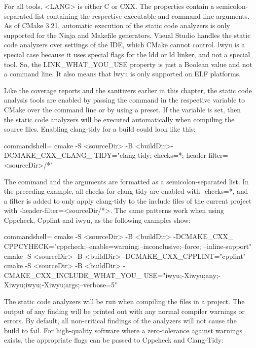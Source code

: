 For all tools, <LANG> is either C or CXX. The properties contain a semicolon-separated list containing the respective executable and command-line arguments. As of CMake 3.21, automatic execution of the static code analyzers is only supported for the Ninja and Makefile generators. Visual Studio handles the static code analyzers over settings of the IDE, which CMake cannot control. lwyu is a special case because it uses special flags for the ldd or ld linker, and not a special tool. So, the LINK\_WHAT\_YOU\_USE property is just a Boolean value and not a command line. It also means that lwyu is only supported on ELF platforms. 

Like the coverage reports and the sanitizers earlier in this chapter, the static code analysis tools are enabled by passing the command in the respective variable to CMake over the command line or by using a preset. If the variable is set, then the static code analyzers will be executed automatically when compiling the source files. Enabling clang-tidy for a build could look like this:

\begin{tcblisting}{commandshell={}}
cmake -S <sourceDir> -B <buildDir>-DCMAKE_CXX_CLANG_
	TIDY="clang-tidy;-checks=*;-header-filter=<sourceDir>/*"
\end{tcblisting}

The command and the arguments are formatted as a semicolon-separated list. In the preceding example, all checks for clang-tidy are enabled with -checks=*, and a filter is added to only apply clang-tidy to the include files of the current project with -header-filter=<sourceDir/*>. The same patterns work when using Cppcheck, Cpplint and iwyu, as the following examples show:

\begin{tcblisting}{commandshell={}}
cmake -S <sourceDir> -B <buildDir> -DCMAKE_CXX_
	CPPCYHECK="cppcheck;--enable=warning;--inconclusive;--force;
		--inline-support"
cmake -S <sourceDir> -B <buildDir> -DCMAKE_CXX_CPPLINT="cpplint"
cmake -S <sourceDir> -B <buildDir> -CMAKE_CXX_INCLUDE_WHAT_YOU_
	USE="iwyu;-Xiwyu;any;-Xiwyu;iwyu;-Xiwyu;args;--verbose=5"
\end{tcblisting}

The static code analyzers will be run when compiling the files in a project. The output of any finding will be printed out with any normal compiler warnings or errors. By default, all non-critical findings of the analyzers will not cause the build to fail. For high-quality software where a zero-tolerance against warnings exists, the appropriate flags can be passed to Cppcheck and Clang-Tidy:

